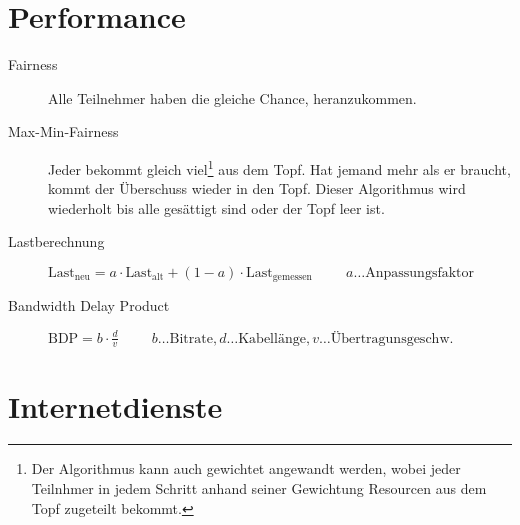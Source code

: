 \documentclass[a4paper]{article}
\newcommand{\hs}[1]{\hspace{#1}}
\begin{document}
\section{Performance}

\begin{description}
    \item[Fairness] Alle Teilnehmer haben die gleiche Chance, heranzukommen.
    \item[Max-Min-Fairness] Jeder bekommt gleich viel\footnote{Der Algorithmus kann auch gewichtet angewandt werden, wobei jeder Teilnhmer in jedem Schritt anhand seiner Gewichtung Resourcen aus dem Topf zugeteilt bekommt.} aus dem Topf. Hat jemand mehr als er braucht, kommt der Überschuss wieder in den Topf. Dieser Algorithmus wird wiederholt bis alle gesättigt sind oder der Topf leer ist.
    \item[Lastberechnung] $\text{Last}_{\text{neu}} = a \cdot \text{Last}_{\text{alt}} + (1 - a) \cdot \text{Last}_{\text{gemessen}} \hs{1cm} a \ldots \text{Anpassungsfaktor}$
    \item[Bandwidth Delay Product] $\text{BDP} = b \cdot \frac{d}{v} \hs{1cm} b \ldots \text{Bitrate}, d \ldots \text{Kabellänge}, v \ldots \text{Übertragunsgeschw.}$ 
\end{description}

\section{Internetdienste}
\end{document}
